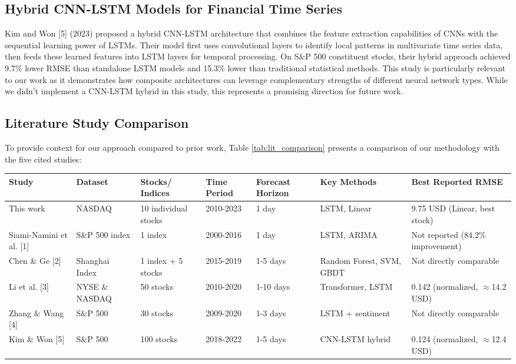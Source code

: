 \documentclass[sigconf]{acmart}
\begin{document}
\subsection{Hybrid CNN-LSTM Models for Financial Time Series}

Kim and Won [5] (2023) proposed a hybrid CNN-LSTM architecture that combines the feature extraction capabilities of CNNs with the sequential learning power of LSTMs. Their model first uses convolutional layers to identify local patterns in multivariate time series data, then feeds these learned features into LSTM layers for temporal processing. On S\&P 500 constituent stocks, their hybrid approach achieved 9.7\% lower RMSE than standalone LSTM models and 15.3\% lower than traditional statistical methods. This study is particularly relevant to our work as it demonstrates how composite architectures can leverage complementary strengths of different neural network types. While we didn't implement a CNN-LSTM hybrid in this study, this represents a promising direction for future work.

\subsection{Literature Study Comparison}

To provide context for our approach compared to prior work, Table \ref{tab:lit_comparison} presents a comparison of our methodology with the five cited studies:

\begin{table*}[tb]
\caption{Comparison of Datasets and Methodologies Across Studies}
\label{tab:lit_comparison}
\begin{tabular}{p{1.5cm}p{1.2cm}p{1.2cm}p{1cm}p{1.2cm}p{1.2cm}p{1.5cm}}
\toprule
\textbf{Study} & \textbf{Dataset} & \textbf{Stocks/ Indices} & \textbf{Time Period} & \textbf{Forecast Horizon} & \textbf{Key Methods} & \textbf{Best Reported RMSE} \\
\midrule
This work & NASDAQ & 10 individual stocks & 2010-2023 & 1 day & LSTM, Linear & 9.75 USD (Linear, best stock) \\
Siami-Namini et al. [1] & S\&P 500 index & 1 index & 2000-2016 & 1 day & LSTM, ARIMA & Not reported (84.2\% improvement) \\
Chen \& Ge [2] & Shanghai Index & 1 index + 5 stocks & 2015-2019 & 1-5 days & Random Forest, SVM, GBDT & Not directly comparable \\
Li et al. [3] & NYSE \& NASDAQ & 50 stocks & 2010-2020 & 1-10 days & Transformer, LSTM & 0.142 (normalized, $\approx$14.2 USD) \\
Zhang \& Wang [4] & S\&P 500 & 30 stocks & 2009-2020 & 1-3 days & LSTM + sentiment & Not directly comparable \\
Kim \& Won [5] & S\&P 500 & 100 stocks & 2018-2022 & 1-5 days & CNN-LSTM hybrid & 0.124 (normalized, $\approx$12.4 USD) \\
\bottomrule
\end{tabular}
\end{table*}
\end{document}
